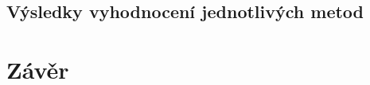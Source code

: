 
\blindtext

\blindtext

\blindtext

\section{Výsledky vyhodnocení jednotlivých metod}
\label{sec:method-evaluation}


\blindtext

\blindtext

\blindtext


\chapter{Závěr}
\label{cha:conclusion}

\blindtext

\blindtext

\blindtext

